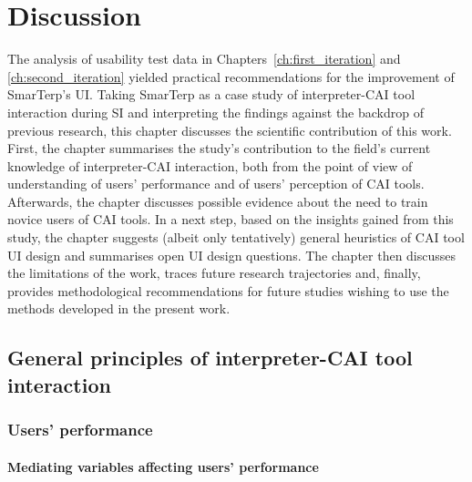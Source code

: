 \chapter{Discussion}\label{ch:discussion}

The analysis of usability test data in Chapters~\ref{ch:first_iteration} and \ref{ch:second_iteration} yielded practical recommendations for the improvement of SmarTerp’s UI. Taking SmarTerp as a case study of interpreter-CAI tool interaction during SI and interpreting the findings against the backdrop of previous research, this chapter discusses the scientific contribution of this work. First, the chapter summarises the study’s contribution to the field’s current knowledge of interpreter-CAI interaction, both from the point of view of understanding of users’ performance and of users’ perception of CAI tools. Afterwards, the chapter discusses possible evidence about the need to train novice users of CAI tools. In a next step, based on the insights gained from this study, the chapter suggests (albeit only tentatively) general heuristics of CAI tool UI design and summarises open UI design questions. The chapter then discusses the limitations of the work, traces future research trajectories and, finally, provides methodological recommendations for future studies wishing to use the methods developed in the present work.

\section{General principles of interpreter-CAI tool interaction}


\subsection{Users' performance}


\subsubsection{Mediating variables affecting users’ performance}

